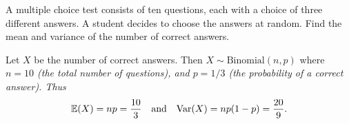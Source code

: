 
\newpage
\begin{example}
A multiple choice test consists of ten questions, each with a choice of three different answers. A student decides to choose the answers at random. Find the mean and variance of the number of correct answers.
\end{example}

\begin{solution}
Let $X$ be the number of correct answers. Then $X\sim\text{Binomial}(n,p)$ where
\bit
\it $n=10$  (the total number of questions), and
\it $p=1/3$ (the probability of a correct answer).
\eit
Thus
\[
\mathbb{E}(X)=np=\frac{10}{3}\quad\text{and}\quad \text{Var}(X)=np(1-p)=\frac{20}{9}.
\]
\end{solution}

